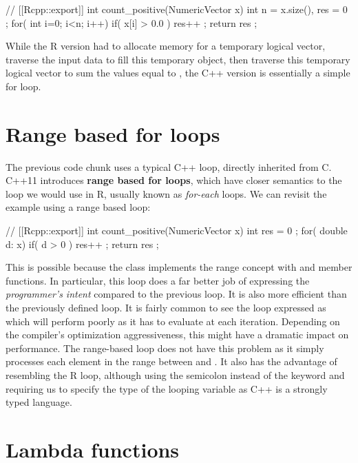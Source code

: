 \begin{example}
// [[Rcpp::export]]
int count_positive(NumericVector x){
  int n = x.size(), res = 0 ;
  for( int i=0; i<n; i++) if( x[i] > 0.0 ) res++ ;
  return res ;
}
\end{example}

While the R version had to allocate memory for a temporary logical
vector, traverse the input data to fill this temporary object, then
traverse this temporary logical vector to sum the values equal to ,
the C++ version is essentially a simple for loop.

\section{Range based for loops}

The previous code chunk uses a typical C++  loop, directly
inherited from C. C++11 introduces \textbf{range based for loops}, which have
closer semantics to the loop we would use in R, usually known as
\textit{for-each} loops. We can revisit the example using a range based
 loop:

\begin{example}
// [[Rcpp::export]]
int count_positive(NumericVector x){
  int res = 0 ;
  for( double d: x){
    if( d > 0 ) res++ ;
  }
  return res ;
}
\end{example}

This is possible because the  class implements
the range concept with  and  member functions. In particular,
this  loop does a far better job of expressing the
\emph{programmer's intent} compared to the previous  loop. It is also
more efficient than the previously defined  loop. It is fairly
common to see the loop expressed as  which
will perform poorly as it has to evaluate  at each iteration.
Depending on the compiler's optimization aggressiveness, this might have a
dramatic impact on performance. The range-based  loop does not
have this problem as it simply processes each element in the range between
 and . It also has the advantage of
resembling the R loop, although using the semicolon instead of the  keyword
and requiring us to specify the type of the looping variable  as C++
is a strongly typed language.

\section{Lambda functions}

